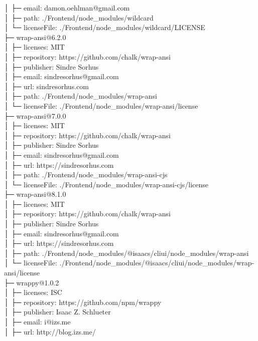 │  ├─ email: damon.oehlman@gmail.com\\
│  ├─ path: ./Frontend/node\_modules/wildcard\\
│  └─ licenseFile: ./Frontend/node\_modules/wildcard/LICENSE\\
├─ wrap-ansi@6.2.0\\
│  ├─ licenses: MIT\\
│  ├─ repository: https://github.com/chalk/wrap-ansi\\
│  ├─ publisher: Sindre Sorhus\\
│  ├─ email: sindresorhus@gmail.com\\
│  ├─ url: sindresorhus.com\\
│  ├─ path: ./Frontend/node\_modules/wrap-ansi\\
│  └─ licenseFile: ./Frontend/node\_modules/wrap-ansi/license\\
├─ wrap-ansi@7.0.0\\
│  ├─ licenses: MIT\\
│  ├─ repository: https://github.com/chalk/wrap-ansi\\
│  ├─ publisher: Sindre Sorhus\\
│  ├─ email: sindresorhus@gmail.com\\
│  ├─ url: https://sindresorhus.com\\
│  ├─ path: ./Frontend/node\_modules/wrap-ansi-cjs\\
│  └─ licenseFile: ./Frontend/node\_modules/wrap-ansi-cjs/license\\
├─ wrap-ansi@8.1.0\\
│  ├─ licenses: MIT\\
│  ├─ repository: https://github.com/chalk/wrap-ansi\\
│  ├─ publisher: Sindre Sorhus\\
│  ├─ email: sindresorhus@gmail.com\\
│  ├─ url: https://sindresorhus.com\\
│  ├─ path: ./Frontend/node\_modules/@isaacs/cliui/node\_modules/wrap-ansi\\
│  └─ licenseFile: ./Frontend/node\_modules/@isaacs/cliui/node\_modules/wrap-ansi/license\\
├─ wrappy@1.0.2\\
│  ├─ licenses: ISC\\
│  ├─ repository: https://github.com/npm/wrappy\\
│  ├─ publisher: Isaac Z. Schlueter\\
│  ├─ email: i@izs.me\\
│  ├─ url: http://blog.izs.me/\\
